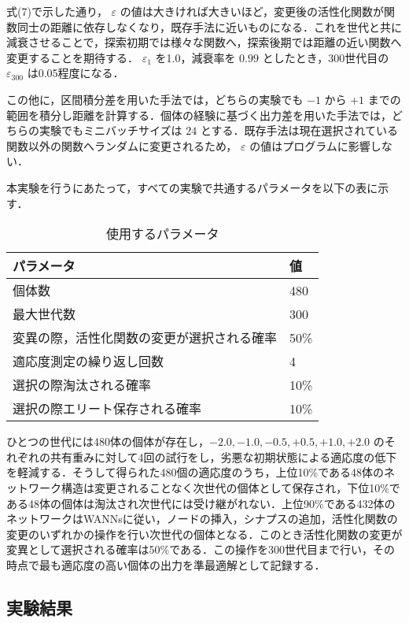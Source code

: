 式(7)で示した通り， $ \varepsilon $ の値は大きければ大きいほど，変更後の活性化関数が関数同士の距離に依存しなくなり，既存手法に近いものになる．これを世代と共に減衰させることで，探索初期では様々な関数へ，探索後期では距離の近い関数へ変更することを期待する． $ \varepsilon_1 $ を1.0，減衰率を $ 0.99 $ としたとき，300世代目の $ \varepsilon_300 $ は0.05程度になる．

この他に，区間積分差を用いた手法では，どちらの実験でも $ -1 $ から $ +1 $ までの範囲を積分し距離を計算する．個体の経験に基づく出力差を用いた手法では，どちらの実験でもミニバッチサイズは $ 24 $ とする．既存手法は現在選択されている関数以外の関数へランダムに変更されるため， $ \varepsilon $ の値はプログラムに影響しない．

本実験を行うにあたって，すべての実験で共通するパラメータを以下の表に示す．

\begin{table}[h]
    \caption{使用するパラメータ}
    \centering
    \begin{tabular}{ll}
        \hline
        パラメータ & 値 \\
        \hline \hline
        個体数 & 480 \\
        最大世代数 & 300 \\
        変異の際，活性化関数の変更が選択される確率 & 50\% \\
        適応度測定の繰り返し回数 & 4 \\
        選択の際淘汰される確率 & 10\% \\
        選択の際エリート保存される確率 & 10\% \\
        \hline
    \end{tabular}
\end{table}

ひとつの世代には480体の個体が存在し，$ -2.0, -1.0, -0.5, +0.5, +1.0, +2.0$ のそれぞれの共有重みに対して4回の試行をし，劣悪な初期状態による適応度の低下を軽減する．そうして得られた480個の適応度のうち，上位10\%である48体のネットワーク構造は変更されることなく次世代の個体として保存され，下位10\%である48体の個体は淘汰され次世代には受け継がれない．上位90\%である432体のネットワークはWANNsに従い，ノードの挿入，シナプスの追加，活性化関数の変更のいずれかの操作を行い次世代の個体となる．このとき活性化関数の変更が変異として選択される確率は50\%である．この操作を300世代目まで行い，その時点で最も適応度の高い個体の出力を準最適解として記録する．

\subsection{実験結果}

